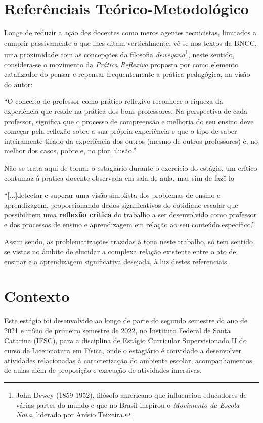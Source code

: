 \section{Referênciais Teórico-Metodológico}
Longe de reduzir a ação dos docentes como meros agentes tecnicistas, limitados a cumprir passivamente o que lhes ditam verticalmente, vê-se nos textos da BNCC, uma proximidade com as concepções da filosofia \emph{deweyana}\footnote{John Dewey (1859-1952), filósofo americano que influenciou educadores de várias partes do mundo e que no Brasil inspirou o \emph{Movimento da Escola Nova}, liderado por Anísio Teixeira.}, neste sentido, considera-se o movimento da \emph{Prática Reflexiva} proposta por \cite{ZEICHNER:1993} como elemento catalizador do pensar e repensar frequentemente a prática pedagógica, na visão do autor:
\begin{citacao}
``O conceito de professor como prático reflexivo reconhece a riqueza da experiência que reside na prática dos bons professores. Na perspectiva de cada professor, significa que o processo de compreensão e melhoria do seu ensino deve começar pela reflexão sobre a sua própria experiência e que o tipo de saber inteiramente tirado da experiência dos outros (mesmo de outros professores) é, no melhor dos casos, pobre e, no pior, ilusão.'' \cite[p. 17]{ZEICHNER:1993}
\end{citacao}
Não se trata aqui de tornar o estagiário durante o exercício do estágio, um crítico contumaz à pratica docente observada em sala de aula, mas sim de fazê-lo 
\begin{citacao}
``[...]detectar e superar uma visão simplista dos problemas de ensino e aprendizagem, proporcionando dados significativos do cotidiano escolar que possibilitem uma \textbf{reflexão crítica} do trabalho a ser desenvolvido como professor e dos processos de ensino e aprendizagem em relação ao seu conteúdo específico.'' \cite[p. 11, \textbf{grifos meus}]{CARVALHOAMP:2012b} 
\end{citacao}
Assim sendo, as problematizações trazidas à tona neste trabalho, só tem sentido se vistas no âmbito de elucidar a complexa relação existente entre o ato de ensinar e a aprendizagem significativa desejada, à luz destes referenciais.

\section{Contexto}
Este estágio foi desenvolvido ao longo de parte do segundo semestre do ano de 2021 e início de primeiro semestre de 2022, no Instituto Federal de Santa Catarina (IFSC), para a disciplina de Estágio Curricular Supervisionado II do curso de Licenciatura em Física, onde o estagiário é convidado a desenvolver atividades relacionadas à caracterização do ambiente escolar, acompanhamentos de aulas além de proposição e execução de atividades imersivas.
 
